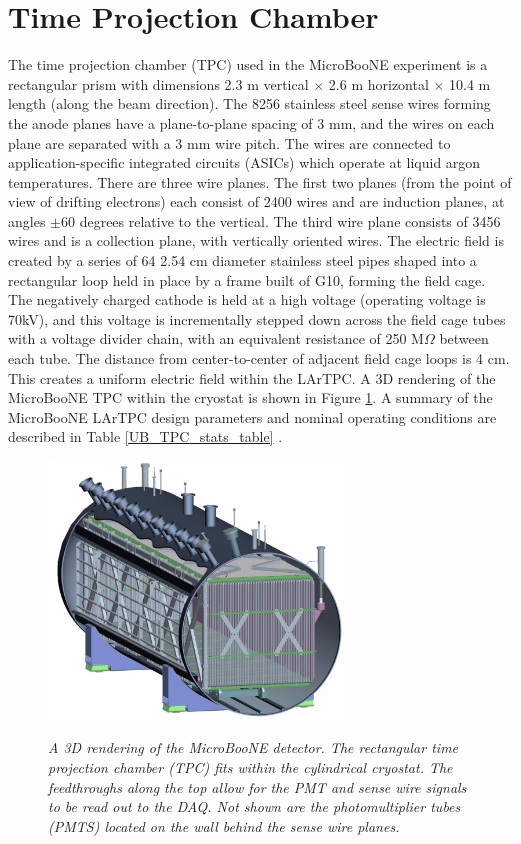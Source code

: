 \section{Time Projection Chamber}
The time projection chamber (TPC) used in the MicroBooNE experiment is a rectangular prism with dimensions 2.3 m vertical $\times$ 2.6 m horizontal $\times$ 10.4 m length (along the beam direction). The 8256 stainless steel sense wires forming the anode planes have a plane-to-plane spacing of 3 mm, and the wires on each plane are separated with a 3 mm wire pitch. The wires are connected to application-specific integrated circuits (ASICs) which operate at liquid argon temperatures. There are three wire planes. The first two planes (from the point of view of drifting electrons) each consist of 2400 wires and are induction planes, at angles $\pm60$ degrees relative to the vertical. The third wire plane consists of 3456 wires and is a collection plane, with vertically oriented wires. The electric field is created by a series of 64  2.54 cm diameter stainless steel pipes shaped into a rectangular loop held in place by a frame built of G10, forming the field cage. The negatively charged cathode is held at a high voltage (operating voltage is 70kV), and this voltage is incrementally stepped down across the field cage tubes with a voltage divider chain, with an equivalent resistance of 250 M$\Omega$ between each tube. The distance from center-to-center of adjacent field cage loops is 4 cm. This creates a uniform electric field within the LArTPC. A 3D rendering of the MicroBooNE TPC within the cryostat is shown in Figure \ref{cryo_3D_rendering_fig}. A summary of the MicroBooNE LArTPC design parameters and nominal operating conditions are described in Table \ref{UB_TPC_stats_table} \cite{UBDetectorPaper}.


\begin{figure}[ht!]
\centering
	\includegraphics[width=0.7\textwidth]{Figures/cryo_3D_rendering.png} \\
\caption{\textit{A 3D rendering of the MicroBooNE detector. The rectangular time projection chamber (TPC) fits within the cylindrical cryostat. The feedthroughs along the top allow for the PMT and sense wire signals to be read out to the DAQ. Not shown are the photomultiplier tubes (PMTS) located on the wall behind the sense wire planes.}}\label{cryo_3D_rendering_fig}
\end{figure}


